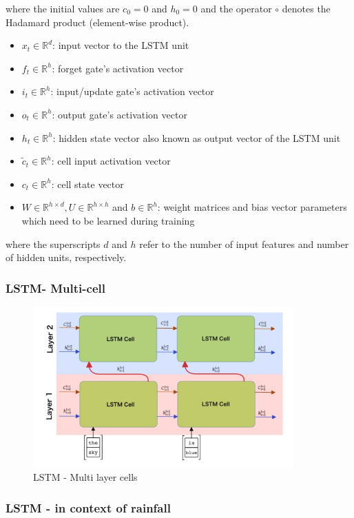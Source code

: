\documentclass{article}
\begin{document}
where the initial values are $c_0 = 0$ and $h_0 = 0$ and the operator $\circ$ denotes the Hadamard product (element-wise product). 

\begin{itemize}
	\item $x_t \in \mathbb{R}^{d}$: input vector to the LSTM unit 
	\item $f_t \in \mathbb{R}^{h}$: forget gate's activation vector
	\item $i_t \in \mathbb{R}^{h}$: input/update gate's activation vector 
	\item $o_t \in \mathbb{R}^{h}$: output gate's activation vector
	\item $h_t \in \mathbb{R}^{h}$: hidden state vector also known as output vector of the LSTM unit 
	\item $\tilde{c}_t \in \mathbb{R}^{h}$: cell input activation vector
	\item $c_t \in \mathbb{R}^{h}$: cell state vector
	\item $W \in \mathbb{R}^{h \times d}, U \in \mathbb{R}^{h \times h} $ and $b \in \mathbb{R}^{h}$: weight matrices and bias vector parameters which need to be learned during training
\end{itemize}

where the superscripts $d$ and $h$ refer to the number of input features and number of hidden units, respectively.


\subsubsection{LSTM- Multi-cell}

\begin{figure}[H]\centering\includegraphics[width=10cm]{LSTM_MULTI.png}\caption{LSTM - Multi layer cells}\end{figure}
\subsubsection{LSTM - in context of rainfall}
\end{document}
